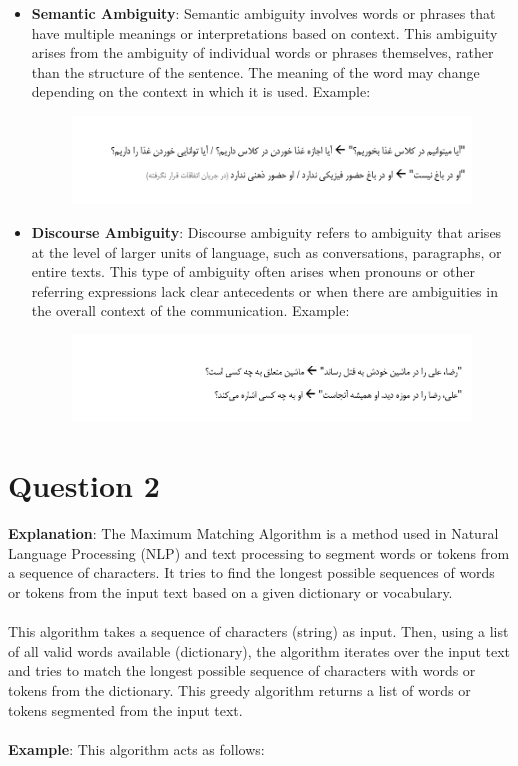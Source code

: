 \documentclass{article}
\begin{document}
\begin{itemize}
    \item \textbf{Semantic Ambiguity}: Semantic ambiguity involves words or phrases that have multiple meanings or interpretations based on context. This ambiguity arises from the ambiguity of individual words or phrases themselves, rather than the structure of the sentence. The meaning of the word may change depending on the context in which it is used. Example:
        \begin{figure}[h]
          \centering
          \includegraphics[width=1\textwidth]{Images/Semantic.png}
          \label{fig:model_diagram}
        \end{figure}

    \item \textbf{Discourse Ambiguity}: Discourse ambiguity refers to ambiguity that arises at the level of larger units of language, such as conversations, paragraphs, or entire texts. This type of ambiguity often arises when pronouns or other referring expressions lack clear antecedents or when there are ambiguities in the overall context of the communication. Example:
        \begin{figure}[h]
          \centering
          \includegraphics[width=1\textwidth]{Images/Discourse.png}
          \label{fig:model_diagram}
        \end{figure}

\end{itemize}
\pagebreak

\section*{Question 2}
\textbf{Explanation}: The Maximum Matching Algorithm is a method used in Natural Language Processing (NLP) and text processing to segment words or tokens from a sequence of characters. It tries to find the longest possible sequences of words or tokens from the input text based on a given dictionary or vocabulary.\\\\
This algorithm takes a sequence of characters (string) as input. Then, using a list of all valid words available (dictionary), the algorithm iterates over the input text and tries to match the longest possible sequence of characters with words or tokens from the dictionary. This greedy algorithm returns a list of words or tokens segmented from the input text.\\\\
\textbf{Example}: This algorithm acts as follows:
\end{document}
